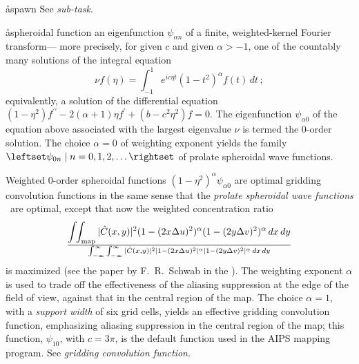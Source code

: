 \aa{spawn} See {\it sub-task}.

\aa{spheroidal function}
an eigenfunction $\psi_{\alpha n}$ of a finite,
weighted-kernel Fourier transform---%
more precisely, for given $c$ and given $\alpha>-1$,
one of the countably many solutions of the integral equation
$$\nu f(\eta)=\int_{-1}^1e^{ic\eta t}(1-t^2)^\alpha f(t)\,dt\,;$$
equivalently, a solution of the differential equation
$(1-\eta^2)f^{\prime\prime}-2(\alpha+1)\eta f^\prime+(b-c^2\eta^2)f=0$.
The eigenfunction $\psi_{\alpha 0}$ of the equation above associated
with the largest eigenvalue $\nu$ is termed the 0-order solution.
The choice $\alpha=0$ of weighting exponent
yields the family $\leftset\psi_{0n}\mid n=0,1,2,\dotsc\rightset$
of prolate spheroidal wave functions.
\par
Weighted 0-order spheroidal functions
$(1-\eta^2)^\alpha\psi_{\alpha 0}$ are optimal
gridding convolution functions in the same sense that
the {\it prolate spheroidal wave functions} \qv\ are optimal,
except that now the weighted concentration ratio
$$\intii_{\operatorname{map}}|\hat C(x,y)|^2
(1-(2x\Delta u)^2)^\alpha (1-(2y\Delta v)^2)^\alpha\,dx\,dy\over
\int_{-\infty}^\infty\int_{-\infty}^\infty|\hat C(x,y)|^2
|1-(2x\Delta u)^2|^\alpha |1-(2y\Delta v)^2|^\alpha\,dx\,dy$$
is maximized
(see the paper by F.~R.~Schwab in the \sydp).
The weighting exponent $\alpha$ is used to trade off
the effectiveness of the aliasing suppression at the edge
of the field of view, against that in the central region of the map.
The choice $\alpha=1$, with a {\it support width} of six \uv grid cells,
yields an effective gridding convolution function,
emphasizing aliasing suppression in the central region of the map;
this function, $\psi_{10}$, with $c=3\pi$, is the default function used in the
AIPS mapping program.
See {\it gridding convolution function}.

